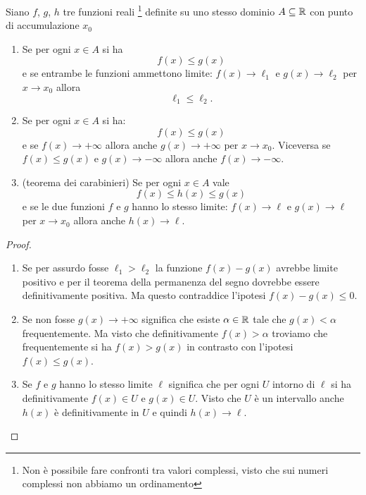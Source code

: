 \begin{theorem}
\label{th:confronto}%
%
%
%
%
\mymark{***}%
Siano 
$f$, $g$, $h$ tre funzioni reali%
\footnote{Non è possibile fare confronti tra valori complessi, visto che
sui numeri complessi non abbiamo un ordinamento}
definite su uno stesso dominio $A\subseteq \mathbb R$ 
con punto di accumulazione $x_0$
\begin{enumerate}
\item
Se per ogni $x\in A$ si ha
\[
f(x) \le g(x)
\]
e se entrambe le funzioni ammettono limite: $f(x) \to \ell_1$ 
e $g(x) \to \ell_2$ per $x\to x_0$
allora
\[
\ell_1 \le \ell_2.
\]

\item
Se per ogni $x\in A$ si ha:
\[
f(x) \le g(x)
\]
e se $f(x)\to +\infty$ allora anche $g(x) \to +\infty$ per $x\to x_0$.
Viceversa se $f(x) \le g(x)$ e $g(x) \to -\infty$ allora anche $f(x) \to -\infty$.

\item
(teorema dei carabinieri)
%
%
Se per ogni $x\in A$ vale
\[
f(x) \le h(x) \le g(x)
\]
 e se le due
funzioni $f$ e $g$ hanno lo stesso limite: $f(x) \to \ell$ e $g(x)\to \ell$
per $x\to x_0$
allora anche $h(x) \to \ell$.
\end{enumerate}
\end{theorem}
%
\begin{proof}
\mymark{**}
\begin{enumerate}
\item
Se per assurdo fosse $\ell_1 > \ell_2$
la funzione $f(x)-g(x)$ avrebbe limite positivo e per il teorema
della permanenza del segno dovrebbe essere definitivamente positiva. 
Ma questo contraddice l'ipotesi $f(x)-g(x)\le 0$. 

\item 
Se non fosse $g(x)\to +\infty$ significa che 
esiste $\alpha \in \mathbb R$ tale che $g(x)<\alpha$ frequentemente. 
Ma visto che definitivamente $f(x)>\alpha$ troviamo 
che frequentemente si ha $f(x)>g(x)$ in contrasto con l'ipotesi 
$f(x)\le g(x)$.

\item
Se $f$ e $g$ hanno lo stesso limite $\ell$ significa che per ogni
$U$ intorno di $\ell$ si ha definitivamente $f(x)\in U$ e $g(x)\in U$.
Visto che $U$ è un intervallo anche $h(x)$ è definitivamente in $U$ 
e quindi $h(x)\to \ell$.
\end{enumerate}
\end{proof}

